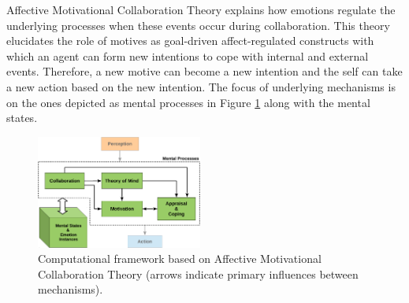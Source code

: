 \documentclass[journal, 11pt]{IEEEtran}
\begin{document}
Affective Motivational Collaboration Theory explains how emotions regulate the
underlying processes when these events occur during collaboration. This theory
elucidates the role of motives as goal-driven affect-regulated constructs with
which an agent can form new intentions to cope with internal and external
events. Therefore, a new motive can become a new intention and the self can take
a new action based on the new intention.  The focus of underlying mechanisms is
on the ones depicted as mental processes in Figure \ref{fig:cpm} along with the
mental states.

\begin{figure}[!t]
  \centering
  \includegraphics[width=0.485\textwidth]{figs/theory-general-croped.pdf}
  \caption{{\fontsize{10}{10}\selectfont Computational framework based on
  Affective Motivational Collaboration Theory (arrows indicate primary
  influences between mechanisms).}}
  \label{fig:cpm}
\end{figure}
\end{document}

